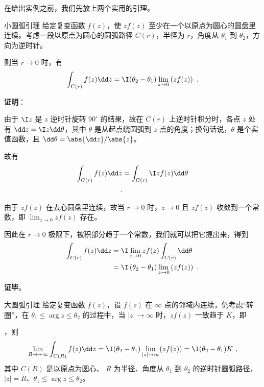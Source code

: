 在给出实例之前，我们先放上两个实用的引理。

\begin{lemma}{小圆弧引理}\label{lem_JdLem_1}
给定复变函数 $f(z)$，使 $zf(z)$ 至少在一个以原点为圆心的圆盘里连续。考虑一段以原点为圆心的圆弧路径 $C(r)$，半径为 $r$，角度从 $\theta_1$ 到 $\theta_2$，方向为逆时针。

则当 $r\to 0$ 时，有
\begin{equation}
\int_{C(r)}f(z)\dd z=\I (\theta_2-\theta_1) \lim\limits_{z\to 0}\left(zf(z)\right)~.
\end{equation}

\end{lemma}


\textbf{证明}：

由于 $\I z$ 是 $z$ 逆时针旋转 $90^\circ$ 的结果，故在 $C(r)$ 上逆时针积分时，各点 $z$ 处有 $\dd z=\I z\dd \theta$，其中 $\theta$ 是从起点绕圆弧到 $z$ 点的角度；换句话说，$\theta$ 是个实值函数，且 $\dd \theta=\abs{\dd z}/\abs{z}$。


故有
\begin{equation}
\begin{aligned}
\int_{C(r)}f(z)\dd z&=\int_{C(r)}\I zf(z)\dd \theta\\~.
\end{aligned}
\end{equation}

由于 $zf(z)$ 在去心圆盘里连续，故当 $r\to 0$ 时，$z\to 0$ 且 $zf(z)$ 收敛到一个常数，即 $\lim_{z\to 0}zf(z)$ 存在。

因此在 $r\to 0$ 极限下，被积部分趋于一个常数，我们就可以把它提出来，得到
\begin{equation}
\begin{aligned}
\int_{C(r)}f(z)\dd z&=\I \lim_{z\to 0}zf(z)\int_{C(r)}\dd \theta\\
&=\I \left(\theta_2-\theta_1 \right) \lim_{z\to 0}\left(zf(z)\right)~.
\end{aligned}
\end{equation}

\textbf{证毕}。










\begin{lemma}{大圆弧引理}
给定复变函数 $f(z)$，设 $f(z)$ 在 $\infty$ 点的邻域内连续，仍考虑“转圈”，在 $\theta_1 \le \arg z \le \theta_2$ 的过程中，当 $|z| \rightarrow \infty$ 时，$z f(z)$ 一致趋于 $K$，即


，则
\begin{equation}
\lim_{R \rightarrow +\infty} \int_{C(R)} f(z) \dd z = \I (\theta_2 - \theta_1) \lim_{|z| \rightarrow \infty} (z f(z)) =  \I (\theta_2 - \theta_1) K ~,
\end{equation}
其中 $C(R)$ 是以原点为圆心、 $R$ 为半径、角度从 $\theta_1$ 到 $\theta_2$ 的逆时针圆弧路径，$|z| = R$、$\theta_1 \le \arg z \le \theta_2$。
\end{lemma}


